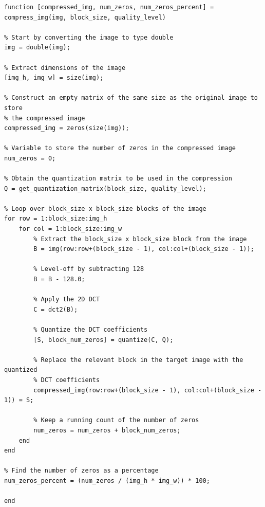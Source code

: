 \documentclass{article}[a4paper]
\begin{document}
	\begin{lstlisting}[caption={Image Compression}, label=compress]
function [compressed_img, num_zeros, num_zeros_percent] = compress_img(img, block_size, quality_level)

% Start by converting the image to type double
img = double(img);

% Extract dimensions of the image
[img_h, img_w] = size(img);

% Construct an empty matrix of the same size as the original image to store
% the compressed image
compressed_img = zeros(size(img));

% Variable to store the number of zeros in the compressed image
num_zeros = 0;

% Obtain the quantization matrix to be used in the compression
Q = get_quantization_matrix(block_size, quality_level);

% Loop over block_size x block_size blocks of the image
for row = 1:block_size:img_h
	for col = 1:block_size:img_w
		% Extract the block_size x block_size block from the image
		B = img(row:row+(block_size - 1), col:col+(block_size - 1));
		
		% Level-off by subtracting 128
		B = B - 128.0;
		
		% Apply the 2D DCT
		C = dct2(B);
		
		% Quantize the DCT coefficients
		[S, block_num_zeros] = quantize(C, Q);
		
		% Replace the relevant block in the target image with the quantized
		% DCT coefficients
		compressed_img(row:row+(block_size - 1), col:col+(block_size - 1)) = S;
		
		% Keep a running count of the number of zeros
		num_zeros = num_zeros + block_num_zeros;
	end
end

% Find the number of zeros as a percentage
num_zeros_percent = (num_zeros / (img_h * img_w)) * 100;

end
	\end{lstlisting}
	
\end{document}
